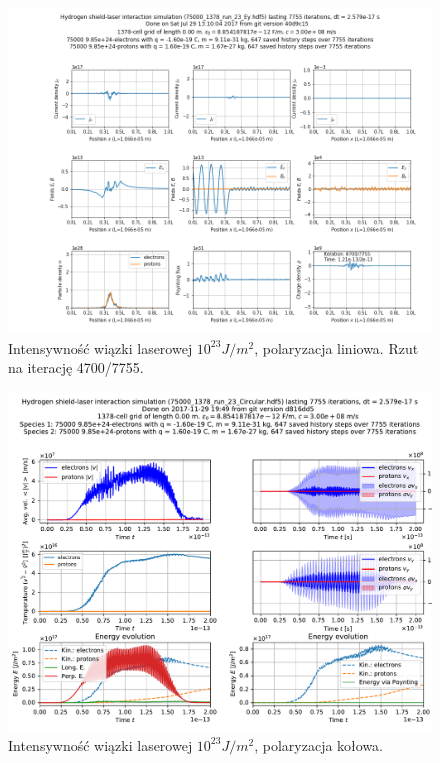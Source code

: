 \begin{figure}[h!]
  \includegraphics[width=\textwidth]{Images/75000_1378_run_23_Ey_004700}
  \caption{Intensywność wiązki laserowej $10^{23} J/m^2$, polaryzacja liniowa. Rzut na iterację 4700/7755.\label{fig:laser-23-Ey-snapshot}}
\end{figure}


\begin{figure}[h!]
  \includegraphics[width=\textwidth]{Images/75000_1378_run_23_Circular}
  \caption{Intensywność wiązki laserowej $10^{23} J/m^2$, polaryzacja kołowa.\label{fig:laser-23-Circular}}
\end{figure}

